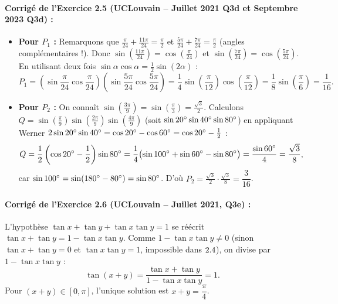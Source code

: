 \paragraph{Corrigé de l'Exercice 2.5 (UCLouvain -- Juillet 2021 Q3d et Septembre 2023 Q3d) :}
\begin{itemize}
    \item \textbf{Pour $P_1$ :} Remarquons que $\frac{\pi}{24} + \frac{11\pi}{24} = \frac{\pi}{2}$ et $\frac{5\pi}{24} + \frac{7\pi}{24} = \frac{\pi}{2}$ (angles complémentaires !). Donc $\sin\left(\frac{11\pi}{24}\right) = \cos\left(\frac{\pi}{24}\right)$ et $\sin\left(\frac{7\pi}{24}\right) = \cos\left(\frac{5\pi}{24}\right)$. En utilisant deux fois $\sin\alpha\cos\alpha = \frac{1}{2}\sin(2\alpha)$ :
    \[
        P_1 = \left(\sin\frac{\pi}{24}\cos\frac{\pi}{24}\right)\left(\sin\frac{5\pi}{24}\cos\frac{5\pi}{24}\right) = \frac{1}{4}\sin\left(\frac{\pi}{12}\right)\cos\left(\frac{\pi}{12}\right) = \frac{1}{8}\sin\left(\frac{\pi}{6}\right) = \boxed{\frac{1}{16}}.
    \]
    \item \textbf{Pour $P_2$ :} On connaît $\sin\left(\frac{3\pi}{9}\right) = \sin\left(\frac{\pi}{3}\right) = \frac{\sqrt{3}}{2}$. Calculons $Q = \sin\left(\frac{\pi}{9}\right)\sin\left(\frac{2\pi}{9}\right)\sin\left(\frac{4\pi}{9}\right)$ (soit $\sin 20\degree\sin 40\degree\sin 80\degree$) en appliquant Werner $2\sin 20\degree\sin 40\degree = \cos 20\degree - \cos 60\degree = \cos 20\degree - \frac{1}{2}$ :
    \[
        Q = \frac{1}{2}\left(\cos 20\degree - \frac{1}{2}\right)\sin 80\degree = \frac{1}{4}\bigl(\sin 100\degree + \sin 60\degree - \sin 80\degree\bigr) = \frac{\sin 60\degree}{4} = \frac{\sqrt{3}}{8},
    \]
    car $\sin 100\degree = \sin(180\degree-80\degree) = \sin 80\degree$. D'où $P_2 = \frac{\sqrt{3}}{2} \cdot \frac{\sqrt{3}}{8} = \boxed{\dfrac{3}{16}}$.
\end{itemize}

\paragraph{Corrigé de l'Exercice 2.6 (UCLouvain -- Juillet 2021, Q3e) :}
L'hypothèse $\tan x + \tan y + \tan x\tan y = 1$ se réécrit $\tan x + \tan y = 1 - \tan x\tan y$. Comme $1 - \tan x\tan y \neq 0$ (sinon $\tan x + \tan y = 0$ et $\tan x\tan y = 1$, impossible dans $2.4$), on divise par $1 - \tan x\tan y$ :
\[
    \tan(x + y) = \frac{\tan x + \tan y}{1 - \tan x\tan y} = 1.
\]
Pour $(x+y) \in [0, \pi]$, l'unique solution est $\boxed{x + y = \dfrac{\pi}{4}}$.

